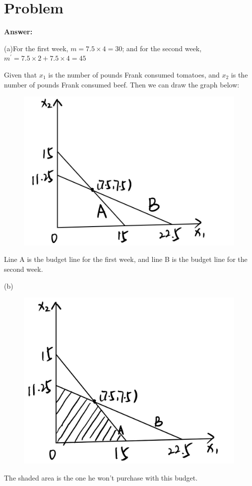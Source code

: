 \documentclass[a4 paper,12pt]{article}
\begin{document}
\section{Problem}
\noindent
\textbf{Answer:}
\par (a)For the first week, $m=7.5\times 4=30$; and for the second week, $m^{\prime}=7.5\times 2+7.5\times 4=45$
\par Given that $x_{1}$ is the number of pounds Frank consumed tomatoes, and $x_{2}$ is  the number of pounds Frank consumed beef. Then we can draw the graph below:
\begin{figure}[H]
    	\begin{center}
    		\includegraphics[width=0.4\linewidth]{pic/3.jpg}
    	\end{center}
    \end{figure} 
\par Line A is the budget line for the first week, and line B is the budget line for the second week.
\par(b)
\begin{figure}[H]
    	\begin{center}
    		\includegraphics[width=0.5\linewidth]{pic/4.jpg}
    	\end{center}
    \end{figure} 
\par The shaded area is the one he won't purchase with this budget.
\end{document}
